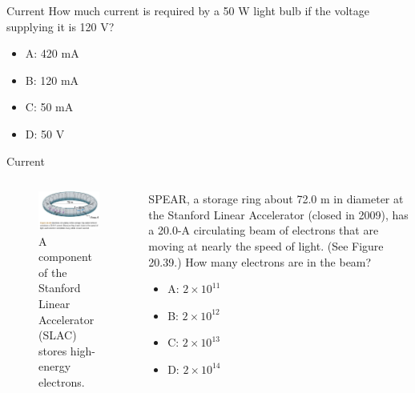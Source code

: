 \documentclass{beamer}
\begin{document}
\begin{frame}{Current}
How much current is required by a 50 W light bulb if the voltage supplying it is 120 V?
\begin{itemize}
\item A: 420 mA
\item B: 120 mA
\item C: 50 mA
\item D: 50 V
\end{itemize}
\end{frame}

\begin{frame}{Current}
\begin{columns}[T]
\begin{column}{0.5\textwidth}
\begin{figure}
\centering
\includegraphics[width=\textwidth]{figures/SPEAR.png}
\caption{\label{fig:SLAC} A component of the Stanford Linear Accelerator (SLAC) stores high-energy electrons.}
\end{figure}
\end{column}
\begin{column}{0.5\textwidth}
\small
SPEAR, a storage ring about 72.0 m in diameter at the Stanford Linear Accelerator (closed in 2009), has a 20.0-A circulating beam of electrons that are moving at nearly the speed of light. (See Figure 20.39.) How many electrons are in the beam?
\begin{itemize}
\item A: $2 \times 10^{11}$
\item B: $2 \times 10^{12}$
\item C: $2 \times 10^{13}$
\item D: $2 \times 10^{14}$
\end{itemize}
\end{column}
\end{columns}
\end{frame}
\end{document}
